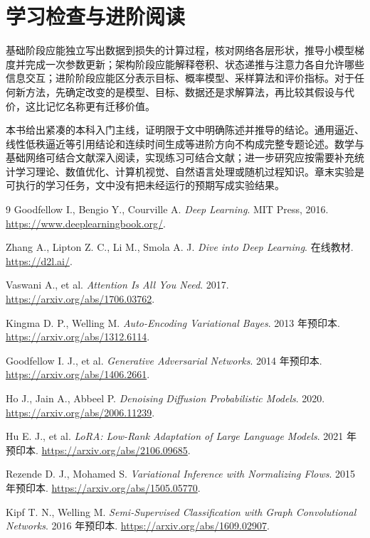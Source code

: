 \documentclass[UTF8,12pt,a4paper,fontset=fandol]{ctexbook}
\begin{document}
\chapter*{学习检查与进阶阅读}
基础阶段应能独立写出数据到损失的计算过程，核对网络各层形状，推导小模型梯度并完成一次参数更新；架构阶段应能解释卷积、状态递推与注意力各自允许哪些信息交互；进阶阶段应能区分表示目标、概率模型、采样算法和评价指标。对于任何新方法，先确定改变的是模型、目标、数据还是求解算法，再比较其假设与代价，这比记忆名称更有迁移价值。

本书给出紧凑的本科入门主线，证明限于文中明确陈述并推导的结论。通用逼近、线性低秩逼近等引用结论和连续时间生成等进阶方向不构成完整专题论述。数学与基础网络可结合文献\cite{goodfellow2016}深入阅读，实现练习可结合文献\cite{d2l}；进一步研究应按需要补充统计学习理论、数值优化、计算机视觉、自然语言处理或随机过程知识。章末实验是可执行的学习任务，文中没有把未经运行的预期写成实验结果。

\begin{thebibliography}{9}
Goodfellow I., Bengio Y., Courville A. \emph{Deep Learning}. MIT Press, 2016. \url{https://www.deeplearningbook.org/}.

Zhang A., Lipton Z. C., Li M., Smola A. J. \emph{Dive into Deep Learning}. 在线教材. \url{https://d2l.ai/}.

Vaswani A., et al. \emph{Attention Is All You Need}. 2017. \url{https://arxiv.org/abs/1706.03762}.

Kingma D. P., Welling M. \emph{Auto-Encoding Variational Bayes}. 2013 年预印本. \url{https://arxiv.org/abs/1312.6114}.

Goodfellow I. J., et al. \emph{Generative Adversarial Networks}. 2014 年预印本. \url{https://arxiv.org/abs/1406.2661}.

Ho J., Jain A., Abbeel P. \emph{Denoising Diffusion Probabilistic Models}. 2020. \url{https://arxiv.org/abs/2006.11239}.

Hu E. J., et al. \emph{LoRA: Low-Rank Adaptation of Large Language Models}. 2021 年预印本. \url{https://arxiv.org/abs/2106.09685}.

Rezende D. J., Mohamed S. \emph{Variational Inference with Normalizing Flows}. 2015 年预印本. \url{https://arxiv.org/abs/1505.05770}.

Kipf T. N., Welling M. \emph{Semi-Supervised Classification with Graph Convolutional Networks}. 2016 年预印本. \url{https://arxiv.org/abs/1609.02907}.
\end{thebibliography}
\end{document}

